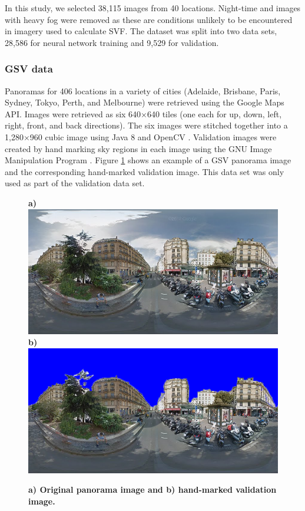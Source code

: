 \documentclass[final,3p,times,authoryear]{elsarticle}
\begin{document}
In this study, we selected 38,115 images from 40 locations. Night-time and images with heavy fog were removed as these are conditions unlikely to be encountered in imagery used to calculate SVF. The dataset was split into two data sets, 28,586 for neural network training and 9,529 for validation.

\subsubsection{GSV data}\label{sec:gsvdata}
Panoramas for 406 locations in a variety of cities (Adelaide, Brisbane, Paris, Sydney, Tokyo, Perth, and Melbourne) were retrieved using the Google Maps API. Images were retrieved as six 640$\times$640 tiles (one each for up, down, left, right, front, and back directions). The six images were stitched together into a 1,280$\times$960 cubic image using Java 8 \citep{Oracle2018} and OpenCV \citep {Bradski2000}. Validation images were created by hand marking sky regions in each image using the GNU Image Manipulation Program \citep{GIMP2019}. Figure \ref{fig:origmarked} shows an example of a GSV panorama image and the corresponding hand-marked validation image. This data set was only used as part of the validation data set.

\begin{figure}
\centering    
\textbf{a)}\includegraphics[scale=0.26]{Images/2/panorama-JtVHmEl7WCiz1xJ0bcJpBg-1.png} 
\textbf{b)}\includegraphics[scale=0.26]{Images/2/panorama-JtVHmEl7WCiz1xJ0bcJpBg-1-marked.png} 

\caption{\bf a) Original panorama image and b) hand-marked validation image.}    
 \label{fig:origmarked}  
\end{figure} 
\end{document}

